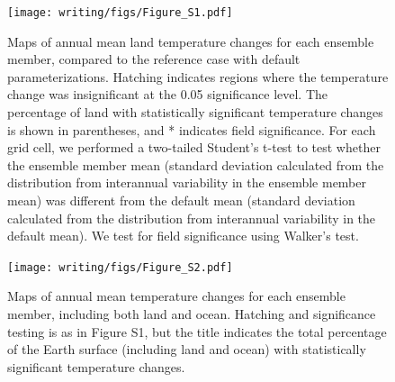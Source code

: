\documentclass[draft,grl]{agutexSI2019}
\begin{document}
%
%
%
%
%




\begin{figure}[htb!]
 \noindent\texttt{[image: writing/figs/Figure\_S1.pdf]}
\caption{Maps of annual mean land temperature changes for each ensemble member, compared to the reference case with default parameterizations. Hatching indicates regions where the temperature change was insignificant at the 0.05 significance level. The percentage of land with statistically significant temperature changes is shown in parentheses, and * indicates field significance. For each grid cell, we performed a two-tailed Student’s t-test to test whether the ensemble member mean (standard deviation calculated from the distribution from interannual variability in the ensemble member mean) was different from the default mean (standard deviation calculated from the distribution from interannual variability in the default mean). We test for field significance using Walker’s test.}
\label{fig:supp_coupled_Ts_land_maps}
\end{figure}

\begin{figure}[htb!]
\noindent\texttt{[image: writing/figs/Figure\_S2.pdf]}
\caption{Maps of annual mean temperature changes for each ensemble member, including both land and ocean. Hatching and significance testing is as in Figure S1, but the title indicates the total percentage of the Earth surface (including land and ocean) with statistically significant temperature changes.}
\label{fig:supp_coupled_Ts_land_and_ocean_maps}
\end{figure}
\end{document}
